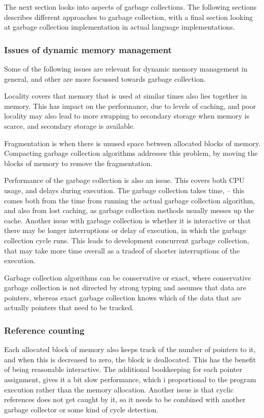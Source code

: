 \documentclass[11pt]{report}
\begin{document}
The next section looks into aspects of garbage collections.
The following sections describes different approaches to garbage collection,
with a final section looking at garbage collection implementation in actual language implementations.

\subsubsection{Issues of dynamic memory management}
Some of the following issues are relevant for dynamic memory management in general, and other are more focussed towards garbage collection.

Locality covers that memory that is used at similar times also lies together in memory.  This has impact on the performance, due to levels of caching, and poor locality may also lead to more swapping to secondary storage when memory is scarce, and secondary storage is available.

Fragmentation is when there is unused space between allocated blocks of memory. 
Compacting garbage collection algorithms addresses this problem, by moving the blocks of memory to remove the fragmentation.

Performance of the garbage collection is also an issue. This covers both CPU usage, and delays during execution.
The garbage collection takes time, -- this comes both from the time from running the actual garbage collection algorithm, and also from lost caching, as garbage collection methods usually messes up the cache.
Another issue with garbage collection is whether it is interactive or that there may be longer interruptions or delay of execution, in which the garbage collection cycle runs. This leads to development concurrent garbage collection, that may take more time overall as a tradeof of shorter interruptions of the execution.

Garbage collection algorithms can be conservative or exact, where conservative garbage collection is not directed by strong typing and assumes that data are pointers, whereas exact garbage collection knows which of the data that are actually pointers that need to be tracked.

\subsubsection{Reference counting}

Each allocated block of memory also keeps track of the number of pointers to it, and when this is decreased to zero, the block is deallocated.
This has the benefit of being reasonable interactive.
The additional bookkeeping for each pointer assignment, gives it a bit slow performance, which i proportional to the program execution rather than the memory allocation. 
Another issue is that cyclic references does not get caught by it, so it needs to be combined with another garbage collector or some kind of cycle detection.
\end{document}

